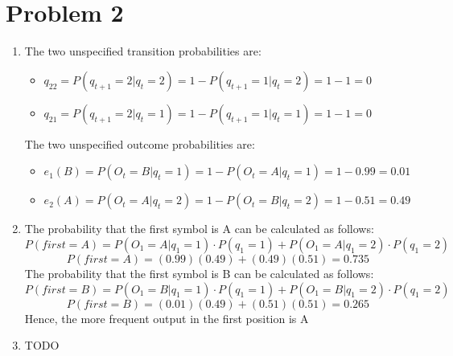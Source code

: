 \documentclass[11pt]{article}
\newcommand{\solution}[1]{{{\color{blue}{\bf Solution:} {#1}}}}
\begin{document}
\section{Problem 2}
\begin{enumerate}
\item \solution{} \newline
The two unspecified transition probabilities are: 
\begin{itemize}
	\item $q_{22} = P(q_{t+1} = 2 | q_t = 2) = 1 - P(q_{t+1} = 1 | q_t = 2) = 1 - 1 = 0$
	\item $q_{21} = P(q_{t+1} = 2 | q_t = 1) = 1 - P(q_{t+1} = 1 | q_t = 1) = 1 - 1 = 0$
\end{itemize}
The two unspecified outcome probabilities are:
\begin{itemize}
	\item $e_1 (B) = P(O_t = B | q_t = 1) = 1 - P(O_t = A | q_t = 1) = 1 - 0.99 = 0.01$
	\item $e_2 (A) = P(O_t = A | q_t = 2) = 1 - P(O_t = B | q_t = 2) = 1 - 0.51 = 0.49$ 
\end{itemize}

\item \solution{} \newline
The probability that the first symbol is A can be calculated as follows:
$$
P(first = A) = P(O_1 = A | q_1 = 1) \cdot P(q_1 = 1) + P(O_1 = A | q_1 = 2) \cdot P(q_1 = 2)
$$
$$
P(first = A) = (0.99) (0.49) + (0.49) (0.51) = 0.735
$$
The probability that the first symbol is B can be calculated as follows:
$$
P(first = B) = P(O_1 = B | q_1 = 1) \cdot P(q_1 = 1) + P(O_1 = B | q_1 = 2) \cdot P(q_1 = 2)
$$
$$
P(first = B) = (0.01) (0.49) + (0.51) (0.51) = 0.265
$$
Hence, the more frequent output in the first position is A

\item \solution{} \newline
TODO
\end{enumerate}

\newpage
\end{document}
